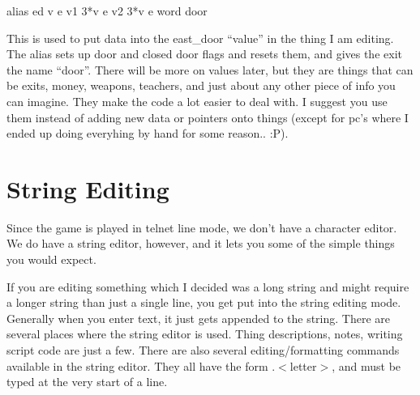 alias ed v e v1 3*v e v2 3*v e word door

This is used to put data into the east\_door ``value'' in the thing I
am editing. The alias sets up door and closed door flags and resets
them, and gives the exit the name ``door''.  There will be more on
values later, but they are things that can be exits, money, weapons,
teachers, and just about any other piece of info you can imagine. They
make the code a lot easier to deal with. I suggest you use them
instead of adding new data or pointers onto things (except for pc's
where I ended up doing everyhing by hand for some reason.. :P).

\section{String Editing}

Since the game is played in telnet line mode, we don't have a
character editor. We do have a string editor, however, and it lets you
some of the simple things you would expect.

If you are editing something which I decided was a long string and might
require a longer string than just a single line, you get put into the
string editing mode. Generally when you enter text, it just gets
appended to the string. There are several places where the string
editor is used. Thing descriptions, notes, writing script code are
just a few. There are also several editing/formatting commands
available in the string editor. They all have the form .$<$letter$>$,
and must be typed at the very start of a line.

